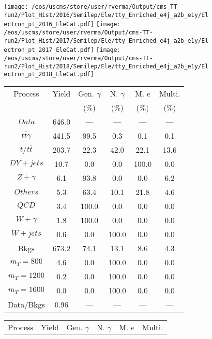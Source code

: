 \begin{figure}
\centering
\texttt{[image: /eos/uscms/store/user/rverma/Output/cms-TT-run2/Plot\_Hist/2016/Semilep/Ele/tty\_Enriched\_e4j\_a2b\_e1y/Electron\_pt\_2016\_EleCat.pdf]}
\texttt{[image: /eos/uscms/store/user/rverma/Output/cms-TT-run2/Plot\_Hist/2017/Semilep/Ele/tty\_Enriched\_e4j\_a2b\_e1y/Electron\_pt\_2017\_EleCat.pdf]}
\texttt{[image: /eos/uscms/store/user/rverma/Output/cms-TT-run2/Plot\_Hist/2018/Semilep/Ele/tty\_Enriched\_e4j\_a2b\_e1y/Electron\_pt\_2018\_EleCat.pdf]}
\begin{minipage}[c]{0.32\textwidth}
\centering
\tiny{
\begin{tabular}{cccccc}
\hline
Process & Yield & Gen. $\gamma$ & N. $\gamma$ & M. e & Multi. \\
 &  & (\%) & (\%) & (\%) & (\%)  \\
\hline
                                                                      $ Data $ &  646.0 &  --- &  --- &  --- &  ---\\
$ t\bar{t}\gamma $ &  441.5 &  99.5 &  0.3 &  0.1 &  0.1\\
$ t/t\bar{t} $ &  203.7 &  22.3 &  42.0 &  22.1 &  13.6\\
$ DY+jets $ &  10.7 &  0.0 &  0.0 &  100.0 &  0.0\\
$ Z+\gamma $ &  6.1 &  93.8 &  0.0 &  0.0 &  6.2\\
$ Others $ &  5.3 &  63.4 &  10.1 &  21.8 &  4.6\\
$ QCD $ &  3.4 &  100.0 &  0.0 &  0.0 &  0.0\\
$ W+\gamma $ &  1.8 &  100.0 &  0.0 &  0.0 &  0.0\\
$ W+jets $ &  0.6 &  0.0 &  100.0 &  0.0 &  0.0\\
Bkgs &  673.2 &  74.1 &  13.1 &  8.6 &  4.3\\
$ m_{T} = 800 $ &  4.6 &  0.0 &  100.0 &  0.0 &  0.0\\
$ m_{T} = 1200 $ &  0.2 &  0.0 &  100.0 &  0.0 &  0.0\\
$ m_{T} = 1600 $ &  0.0 &  0.0 &  100.0 &  0.0 &  0.0\\
Data/Bkgs &  0.96 &  --- &  --- &  --- &  ---\\
\hline
\end{tabular}
}
\end{minipage}
\begin{minipage}[c]{0.32\textwidth}
\centering
\tiny{
\begin{tabular}{cccccc}
\hline
Process & Yield & Gen. $\gamma$ & N. $\gamma$ & M. e & Multi. \\

\end{tabular}}
\end{minipage}
\end{figure}
